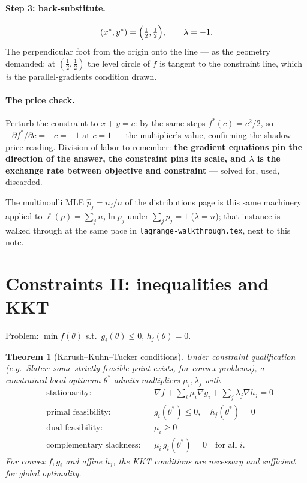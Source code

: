 \documentclass[11pt]{article}
\newtheorem{theorem}{Theorem}
\begin{document}
\paragraph{Step 3: back-substitute.}
\begin{equation}
  (x^\ast, y^\ast) = \Bigl(\tfrac12, \tfrac12\Bigr),
  \qquad \lambda = -1 .
  \label{eq:lagexample}
\end{equation}
The perpendicular foot from the origin onto the line --- as the
geometry demanded: at $(\tfrac12,\tfrac12)$ the level circle of $f$ is
tangent to the constraint line, which \emph{is} the parallel-gradients
condition drawn.

\paragraph{The price check.} Perturb the constraint to $x + y = c$: by
the same steps $f^\ast(c) = c^2/2$, so
$-\partial f^\ast/\partial c = -c = -1$ at $c=1$ --- the multiplier's
value, confirming the shadow-price reading. Division of labor to
remember: \textbf{the gradient equations pin the direction of the
answer, the constraint pins its scale, and $\lambda$ is the exchange
rate between objective and constraint} --- solved for, used, discarded.

The multinoulli MLE $\hat p_j = n_j/n$ of the distributions page is this
same machinery applied to $\ell(p) = \sum_j n_j \ln p_j$ under
$\sum_j p_j = 1$ ($\lambda = n$); that instance is walked through at the
same pace in \texttt{lagrange-walkthrough.tex}, next to this note.

\section{Constraints II: inequalities and KKT}

Problem: $\min f(\theta)$ s.t.\ $g_i(\theta) \le 0$, $h_j(\theta) = 0$.

\begin{theorem}[Karush--Kuhn--Tucker conditions]
Under constraint qualification (e.g.\ Slater: some strictly feasible point
exists, for convex problems), a constrained local optimum
$\theta^\ast$ admits multipliers $\mu_i, \lambda_j$ with
\begin{equation}
  \begin{aligned}
    &\text{stationarity:}
    && \nabla f + \textstyle\sum_i \mu_i \nabla g_i
       + \sum_j \lambda_j \nabla h_j = 0 \\
    &\text{primal feasibility:}
    && g_i(\theta^\ast) \le 0, \quad h_j(\theta^\ast) = 0 \\
    &\text{dual feasibility:}
    && \mu_i \ge 0 \\
    &\text{complementary slackness:}
    && \mu_i\, g_i(\theta^\ast) = 0 \quad \text{for all } i.
  \end{aligned}
  \label{eq:kkt}
\end{equation}
For convex $f, g_i$ and affine $h_j$, the KKT conditions are necessary
\emph{and sufficient} for global optimality.
\end{theorem}
\end{document}
